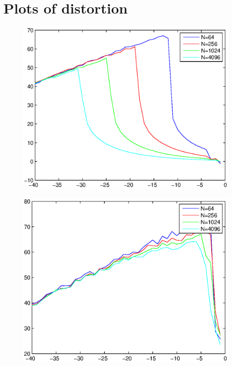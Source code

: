 \documentclass{article}
\begin{document}
\section {Plots of distortion}
\begin{figure}[H]
\includegraphics{test0.eps}
\end{figure}
\begin{figure}[H]
\includegraphics{test1.eps}
\end{figure}
\end{document}
